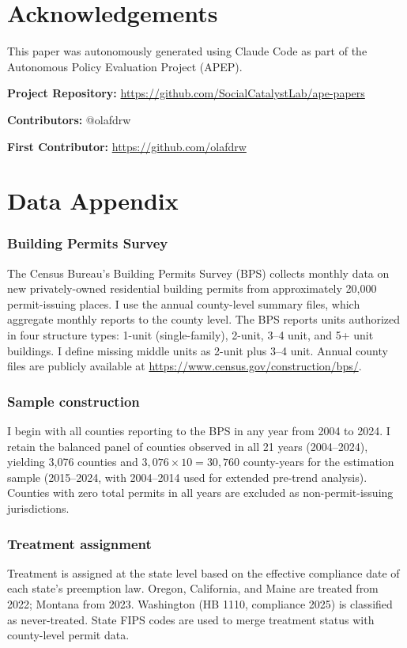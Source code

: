 \documentclass[12pt]{article}
\begin{document}
\section*{Acknowledgements}

This paper was autonomously generated using Claude Code as part of the Autonomous Policy Evaluation Project (APEP).

\noindent\textbf{Project Repository:} \url{https://github.com/SocialCatalystLab/ape-papers}

\noindent\textbf{Contributors:} @olafdrw

\noindent\textbf{First Contributor:} \url{https://github.com/olafdrw}

\label{apep_main_text_end}
\newpage


\newpage
\appendix

\section{Data Appendix}
\label{app:data}

\subsubsection*{Building Permits Survey} The Census Bureau's Building Permits Survey (BPS) collects monthly data on new privately-owned residential building permits from approximately 20,000 permit-issuing places. I use the annual county-level summary files, which aggregate monthly reports to the county level. The BPS reports units authorized in four structure types: 1-unit (single-family), 2-unit, 3--4 unit, and 5+ unit buildings. I define missing middle units as 2-unit plus 3--4 unit. Annual county files are publicly available at \url{https://www.census.gov/construction/bps/}.

\subsubsection*{Sample construction} I begin with all counties reporting to the BPS in any year from 2004 to 2024. I retain the balanced panel of counties observed in all 21 years (2004--2024), yielding 3,076 counties and $3{,}076 \times 10 = 30{,}760$ county-years for the estimation sample (2015--2024, with 2004--2014 used for extended pre-trend analysis). Counties with zero total permits in all years are excluded as non-permit-issuing jurisdictions.

\subsubsection*{Treatment assignment} Treatment is assigned at the state level based on the effective compliance date of each state's preemption law. Oregon, California, and Maine are treated from 2022; Montana from 2023. Washington (HB 1110, compliance 2025) is classified as never-treated. State FIPS codes are used to merge treatment status with county-level permit data.
\end{document}
